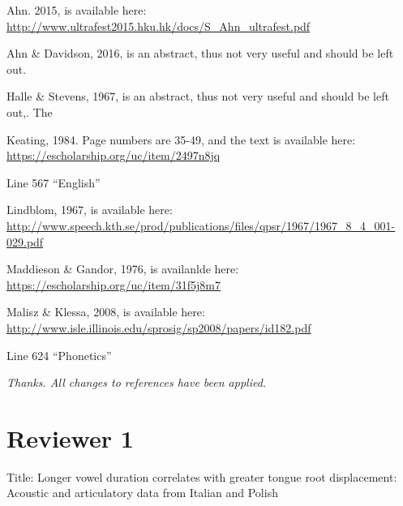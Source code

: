 \documentclass[]{article}
\begin{document}
Ahn. 2015, is available here:
\url{http://www.ultrafest2015.hku.hk/docs/S_Ahn_ultrafest.pdf}

Ahn \& Davidson, 2016, is an abstract, thus not very useful and should
be left out.

Halle \& Stevens, 1967, is an abstract, thus not very useful and should
be left out,. The

Keating, 1984. Page numbers are 35-49, and the text is available here:
\url{https://escholarship.org/uc/item/2497n8jq}

Line 567 ``English''

Lindblom, 1967, is available here:
\url{http://www.speech.kth.se/prod/publications/files/qpsr/1967/1967_8_4_001-029.pdf}

Maddieson \& Gandor, 1976, is availanlde here:
\url{https://escholarship.org/uc/item/31f5j8m7}

Malisz \& Klessa, 2008, is available here:
\url{http://www.isle.illinois.edu/sprosig/sp2008/papers/id182.pdf}

Line 624 ``Phonetics''

\begin{adjustwidth}{1cm}{} \textit{
Thanks. All changes to references have been applied.
} \end{adjustwidth}

\hypertarget{reviewer-1}{%
\section{Reviewer 1}\label{reviewer-1}}

Title: Longer vowel duration correlates with greater tongue root
displacement: Acoustic and articulatory data from Italian and Polish
\end{document}

